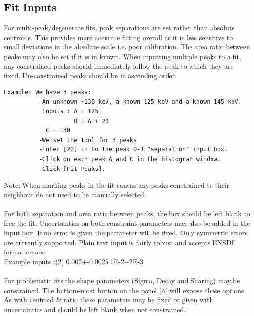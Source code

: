 \documentclass[a4paper,10pt]{article}
\begin{document}
\subsection{Fit Inputs}
For multi-peak/degenerate fits, peak separations are set rather than absolute centroids. This provides more accurate fitting overall as it is less sensitive to small deviations in the absolute scale i.e. poor calibration. The area ratio between peaks may also be set if it is in known. When inputting multiple peaks to a fit, any constrained peaks should immediately follow the peak to which they are fixed. Un-constrained peaks should be in ascending order.
\begin{lstlisting}
Example: We have 3 peaks:
           An unknown ~130 keV, a known 125 keV and a known 145 keV.
           Inputs : A = 125
                    B = A + 20
		    C = 130
          -We set the tool for 3 peaks
          -Enter [20] in to the peak 0-1 "separation" input box.
          -Click on each peak A and C in the histogram window.
          -Click [Fit Peaks].
\end{lstlisting}
Note: When marking peaks in the fit canvas any peaks constrained to their neighbour do not need to be manually selected.
\\
\\
For both separation and area ratio between peaks, the box should be left blank to free the fit. Uncertainties on both constraint parameters may also be added in the input box. If no error is given the parameter will be fixed. Only symmetric errors are currently supported. Plain text input is fairly robust and accepts ENSDF format errors:\\
Example inputs :(2) 0.002+-0.002\qquad5.1E-2+2E-3
\\
\\
For problematic fits the shape parameters (Sigma, Decay and Sharing) may be constrained. The bottom-most button on the panel [$\wedge$] will expose these options. As with centroid \& ratio these parameters may be fixed or given with uncertainties and should be left blank when not constrained.
\end{document}
